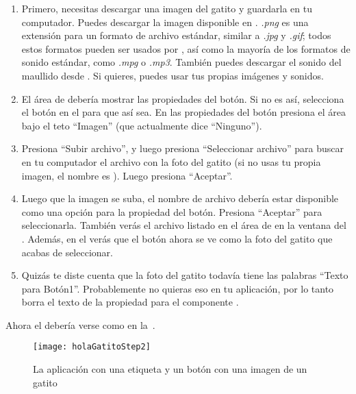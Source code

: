 \begin{enumerate}

\item Primero, necesitas descargar una imagen del gatito y guardarla
  en tu computador. Puedes descargar la imagen disponible en
  . \emph{.png} es una
  extensión para un formato de archivo estándar, similar a \emph{.jpg}
  y \emph{.gif}; todos estos formatos pueden ser usados por
  \AppInventor, así como la mayoría de los formatos de sonido
  estándar, como \emph{.mpg} o \emph{.mp3}. También puedes descargar
  el sonido del maullido desde
  . Si quieres, puedes usar
  tus propias imágenes y sonidos.

\item El área de \properties debería mostrar las propiedades del
  botón. Si no es así, selecciona el botón en el \viewer para que así
  sea. En las propiedades del botón presiona el área bajo el teto
  ``Imagen'' (que actualmente dice ``Ninguno'').

\item Presiona ``Subir archivo'', y luego presiona ``Seleccionar
  archivo'' para buscar en tu computador el archivo con la foto del
  gatito (si no usas tu propia imagen, el nombre es
  ). Luego presiona ``Aceptar''.

\item Luego que la imagen se suba, el nombre de archivo debería estar
  disponible como una opción para la propiedad  del
  botón. Presiona ``Aceptar'' para seleccionarla. También verás el
  archivo listado en el área de \media en la ventana del
  \designer. Además, en el \designer verás que el botón ahora se ve
  como la foto del gatito que acabas de seleccionar.

\item Quizás te diste cuenta que la foto del gatito todavía tiene las
  palabras ``Texto para Botón1''. Probablemente no quieras eso en tu
  aplicación, por lo tanto borra el texto de la propiedad
   para el componente .

\end{enumerate}

Ahora el \designer debería verse como en
la~.

\begin{figure}[H]
\centering
\texttt{[image: holaGatitoStep2]}
\caption{La aplicación con una etiqueta y un botón con una imagen de
  un gatito}
\label{fig:holaGatitoStep2}
\end{figure}

